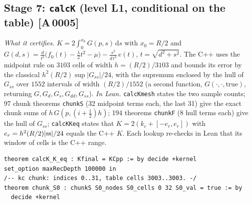 \documentclass[10pt]{article}
\newcommand{\tg}[2]{\texorpdfstring{\textsf{[#1\,#2]}}{}}  %
\newcommand{\lean}[1]{\texttt{#1}}
\newcommand{\dd}{\,\mathrm{d}}
\renewcommand{\_}{\textunderscore\allowbreak}
\begin{document}
\subsection{Stage 7: \lean{calcK} (level L1, conditional on the table) \tg{A}{0005}}
\emph{What it certifies.} $K=2\int_0^{x_0}G(p,s)\dd s$ with $x_0=R/2$ and
$G(d,s)=\frac{d}{t^2}\bigl(f_0(t)-\tfrac\lambda2t^2-\mu\bigr)-\frac{s^2}{d\,t^2}\,e(t)$, $t=\sqrt{d^2+s^2}$.
The C++ uses the midpoint rule on $3103$ cells of width $h=(R/2)/3103$ and bounds its error by the classical $h^2(R/2)\sup|G_{ss}|/24$, with the supremum enclosed by the hull of $G_{ss}$ over $1552$ intervals of width $(R/2)/1552$ (a second function, $G(\cdot,\cdot,\mathrm{true})$, returning $G,G_d,G_s,G_{dd},G_{ss}$).
\emph{In Lean.} \lean{calcK\_mesh} states the two sample counts; 97 chunk theorems \lean{chunkS} (32 midpoint terms each, the last 31) give the exact chunk sums of $h\,G(p,(i+\tfrac12)h)$; 194 theorems \lean{chunkF} (8 hull terms each) give the hull of $G_{ss}$; \lean{calcK\_K\_eq} states that $K=2(k_c+[-e_r,e_r])$ with $e_r=h^2(R/2)|{\rm ss}|/24$ equals the C++ $K$. Each lookup re-checks in Lean that its window of cells is the C++ range.
\begin{lstlisting}
theorem calcK_K_eq : Kfinal = KCpp := by decide +kernel
set_option maxRecDepth 100000 in
/-- kc chunk: indices 0..31, table cells 3003..3003. -/
theorem chunk_S0 : chunkS S0_nodes S0_cells 0 32 S0_val = true := by
  decide +kernel
\end{lstlisting}
\end{document}
